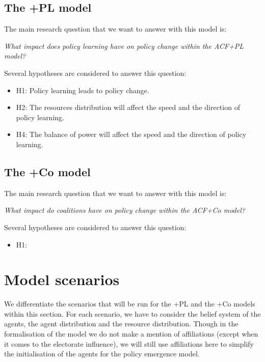 \documentclass[12pt]{article}
\begin{document}
\subsection{The +PL model}

The main research question that we want to answer with this model is:

\emph{What impact does policy learning have on policy change within the ACF+PL model?}

Several hypotheses are considered to answer this question:

\begin{itemize}
\item H1: Policy learning leads to policy change.
\item H2: The resources distribution will affect the speed and the direction of policy learning.
\item H4: The balance of power will affect the speed and the direction of policy learning.
\end{itemize}

\subsection{The +Co model}

The main research question that we want to answer with this model is:

\emph{What impact do coalitions have on policy change within the ACF+Co model?}

Several hypotheses are considered to answer this question:

\begin{itemize}
\item H1: 
\end{itemize}


\section{Model scenarios}
\label{sec:steps}

We differentiate the scenarios that will be run for the +PL and the +Co models within this section. For each scenario, we have to consider the belief system of the agents, the agent distribution and the resource distribution. Though in the formalisation of the model we do not make a mention of affiliations (except when it comes to the electorate influence), we will still use affiliations here to simplify the initialisation of the agents for the policy emergence model.
\end{document}
